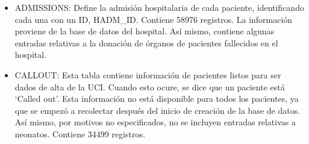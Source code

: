 \documentclass{report}
\begin{document}
\begin{itemize}
\item
  ADMISSIONS: Define la admisión hospitalaria de cada paciente,
  identificando cada una con un ID, HADM\_ID. Contiene 58976
  registros. La información proviene de la base de datos del hospital.
  Así mismo, contiene algunas entradas relativas a la donación de
  órganos de pacientes fallecidos en el hospital.
\item
  CALLOUT: Esta tabla contiene información de pacientes listos para ser
  dados de alta de la UCI. Cuando esto ocure, se dice que un paciente
  está `Called out'. Esta información no está disponible para todos los
  pacientes, ya que se empezó a recolectar después del inicio de
  creación de la base de datos. Así mismo, por motivos no especificados,
  no se incluyen entradas relativas a neonatos. Contiene 34499
  registros.


\end{itemize}
\end{document}
